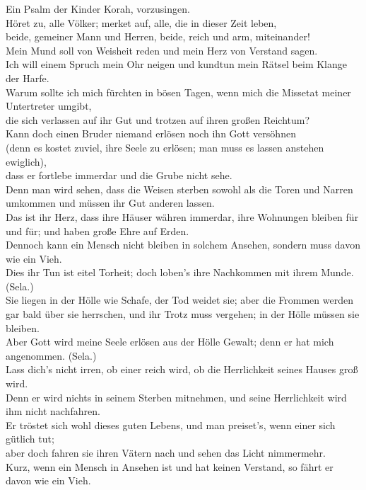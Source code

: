 Ein Psalm der Kinder Korah, vorzusingen.\\
 Höret zu, alle Völker; merket auf, alle, die in dieser
Zeit leben,\\
 beide, gemeiner Mann und Herren, beide, reich und arm,
miteinander!\\
 Mein Mund soll von Weisheit reden und mein Herz von
Verstand sagen.\\
 Ich will einem Spruch mein Ohr neigen und kundtun mein
Rätsel beim Klange der Harfe.\\
 Warum sollte ich mich fürchten in bösen Tagen, wenn mich
die Missetat meiner Untertreter umgibt,\\
 die sich verlassen auf ihr Gut und trotzen auf ihren
großen Reichtum?\\
 Kann doch einen Bruder niemand erlösen noch ihn Gott
versöhnen\\
 (denn es kostet zuviel, ihre Seele zu erlösen; man muss
es lassen anstehen ewiglich),\\
 dass er fortlebe immerdar und die Grube nicht sehe.\\
 Denn man wird sehen, dass die Weisen sterben sowohl als
die Toren und Narren umkommen und müssen ihr Gut anderen lassen.\\
 Das ist ihr Herz, dass ihre Häuser währen immerdar, ihre
Wohnungen bleiben für und für; und haben große Ehre auf Erden.\\
 Dennoch kann ein Mensch nicht bleiben in solchem
Ansehen, sondern muss davon wie ein Vieh.\\
 Dies ihr Tun ist eitel Torheit; doch loben's ihre
Nachkommen mit ihrem Munde. (Sela.)\\
 Sie liegen in der Hölle wie Schafe, der Tod weidet sie;
aber die Frommen werden gar bald über sie herrschen, und ihr Trotz muss
vergehen; in der Hölle müssen sie bleiben.\\
 Aber Gott wird meine Seele erlösen aus der Hölle Gewalt;
denn er hat mich angenommen. (Sela.)\\
 Lass dich's nicht irren, ob einer reich wird, ob die
Herrlichkeit seines Hauses groß wird.\\
 Denn er wird nichts in seinem Sterben mitnehmen, und
seine Herrlichkeit wird ihm nicht nachfahren.\\
 Er tröstet sich wohl dieses guten Lebens, und man
preiset's, wenn einer sich gütlich tut;\\
 aber doch fahren sie ihren Vätern nach und sehen das
Licht nimmermehr.\\
 Kurz, wenn ein Mensch in Ansehen ist und hat keinen
Verstand, so fährt er davon wie ein Vieh.

